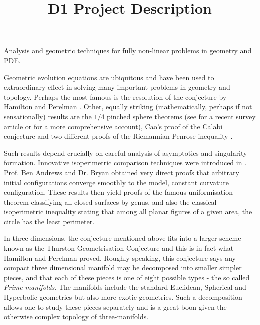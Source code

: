 \documentclass[12pt]{amsart}
\date{}
\title{D1 Project Description}
\renewcommand\maketitle{}
\begin{document}
\maketitle

\smallskip{}
\label{sec:orgheadline1}
Analysis and geometric techniques for fully non-linear problems in geometry and PDE.

\smallskip{}
\label{sec:orgheadline5}
Geometric evolution equations are ubiquitous and have been used to extraordinary effect in solving many important problems in geometry and topology.  Perhaps the most famous is the resolution of the \poincare{} conjecture by Hamilton and Perelman \cite{MR2334563}.  Other, equally striking (mathematically, perhaps if not sensationally) results are the \(1/4\) pinched sphere theorems (see \cite{MR2738904} for a recent survey article or \cite{MR2760593} for a more comprehensive account), Cao's proof of the Calabi conjecture \cite{MR799272} and two different proofs of the Riemannian Penrose inequality \cite{MR1916951, MR1908823}.

Such results depend crucially on careful analysis of asymptotics and singularity formation. Innovative isoperimetric comparison techniques were introduced in \cite{MR2729306,MR2794630,MR2843240,pbthesis,Bryan}. Prof. Ben Andrews and Dr. Bryan obtained very direct proofs that arbitrary initial configurations converge smoothly to the model, constant curvature configuration. These results then yield proofs of the famous uniformisation theorem classifying all closed surfaces by genus, and also the classical isoperimetric inequality stating that among all planar figures of a given area, the circle has the least perimeter.

In three dimensions, the \poincare{} conjecture mentioned above fits into a larger scheme known as the Thurston Geometrisation Conjecture \cite{MR2334563} and this is in fact what Hamilton and Perelman proved. Roughly speaking, this conjecture says any compact three dimensional manifold may be decomposed into smaller simpler pieces, and that each of these pieces is one of eight possible types - the so called \emph{Prime manifolds}. The manifolds include the standard Euclidean, Spherical and Hyperbolic geometries but also more exotic geometries. Such a decomposition allows one to study these pieces separately and is a great boon given the otherwise complex topology of three-manifolds.
\end{document}
